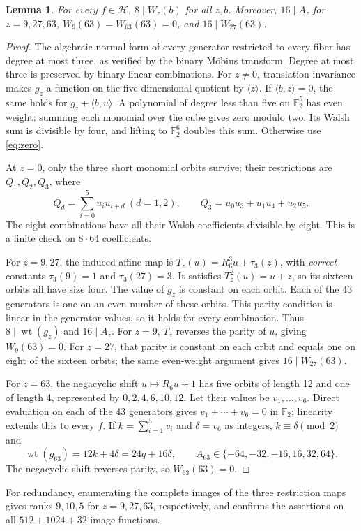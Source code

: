 \documentclass[11pt,a4paper]{article}
\newcommand{\F}{\mathbb F_2}
\newcommand{\wt}{\operatorname{wt}}
\newtheorem{lemma}[theorem]{Lemma}
\begin{document}
\begin{lemma}\label{lem:div}
For every $f\in\mathcal H$, $8\mid W_z(b)$ for all $z,b$.
Moreover, $16\mid A_z$ for $z=9,27,63$,
$W_9(63)=W_{63}(63)=0$, and $16\mid W_{27}(63)$.
\end{lemma}
\begin{proof}
The algebraic normal form of every generator restricted to every fiber
has degree at most three, as verified by the binary M\"obius transform.
Degree at most three is preserved by binary linear combinations. For
$z\ne0$, translation invariance makes $g_z$ a function on the
five-dimensional quotient by $\langle z\rangle$. If $\langle b,z\rangle=0$,
the same holds for $g_z+\langle b,u\rangle$. A polynomial of degree less
than five on $\F^5$ has even weight: summing each monomial over the cube
gives zero modulo two. Its Walsh sum is divisible by four, and lifting
to $\F^6$ doubles this sum. Otherwise use \eqref{eq:zero}.

At $z=0$, only the three short monomial orbits survive; their restrictions
are $Q_1,Q_2,Q_3$, where
\[
 Q_d=\sum_{i=0}^5u_i u_{i+d}\ (d=1,2),\qquad
 Q_3=u_0u_3+u_1u_4+u_2u_5.
\]
The eight combinations have all their Walsh coefficients divisible by eight.
This is a finite check on $8\cdot64$ coefficients.

For $z=9,27$, the induced affine map is
$T_z(u)=R_6^3u+\tau_3(z)$, with \emph{correct} constants
$\tau_3(9)=1$ and $\tau_3(27)=3$. It satisfies $T_z^2(u)=u+z$,
so its sixteen orbits all have size four. The value of $g_z$ is constant
on each orbit. Each of the 43 generators is one on an even number of
these orbits. This parity condition is linear in the generator values,
so it holds for every combination. Thus $8\mid\wt(g_z)$ and
$16\mid A_z$. For $z=9$, $T_z$ reverses the parity of $u$, giving
$W_9(63)=0$. For $z=27$, that parity is constant on each orbit and equals
one on eight of the sixteen orbits; the same even-weight argument gives
$16\mid W_{27}(63)$.

For $z=63$, the negacyclic shift $u\mapsto R_6u+1$ has five orbits
of length 12 and one of length 4, represented by $0,2,4,6,10,12$.
Let their values be $v_1,\ldots,v_6$. Direct evaluation on each of
the 43 generators gives $v_1+\cdots+v_6=0$ in $\F$; linearity
extends this to every $f$. If $k=\sum_{i=1}^5v_i$ and $\delta=v_6$
as integers, $k\equiv\delta\pmod2$ and
\[
 \wt(g_{63})=12k+4\delta=24q+16\delta,
 \qquad A_{63}\in\{-64,-32,-16,16,32,64\}.
\]
The negacyclic shift reverses parity, so $W_{63}(63)=0$.
\end{proof}
For redundancy, enumerating the complete images of the three restriction
maps gives ranks $9,10,5$ for $z=9,27,63$, respectively, and confirms
the assertions on all $512+1024+32$ image functions.
\end{document}
